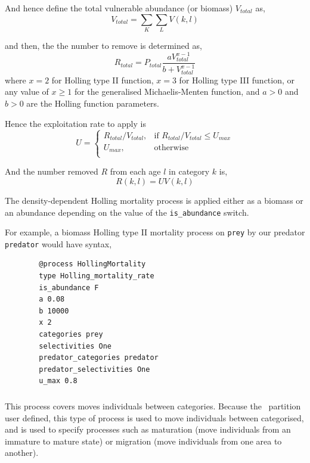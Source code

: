 And hence define the total vulnerable abundance (or biomass) $V_{total}$ as,
\begin{equation}
	V_{total}  = \sum\limits_K {\sum\limits_L {V(k,l)}} 
\end{equation}

and then, the the number to remove is determined as,
\begin{equation}
	R_{total} = P_{total} \frac{a  V_{total}^{x-1}}{b + V_{total}^{x-1}}
\end{equation}
where $x=2$ for Holling type II function,  $x=3$ for Holling type III function, or any value of $x \geq 1$ for the generalised Michaelis-Menten function, and $a > 0$ and $b > 0$ are the Holling function parameters.

Hence the exploitation rate to apply is 
\begin{equation}
	U = \begin{cases}
		R_{total}/V_{total}, & \text{if $R_{total}/V_{total} \leq U_{max}$} \\
		U_{max}, & \text{otherwise}\\ 
	\end{cases} 
\end{equation}

And the number removed $R$ from each age $l$ in category $k$ is,
\begin{equation}
	R(k,l) = UV(k,l)
\end{equation}

The density-dependent Holling mortality process is applied either as a biomass or an abundance depending on the value of the \texttt{is\_abundance} switch.

For example, a biomass Holling type II mortality process on \texttt{prey} by our predator \texttt{predator} would have syntax,

{\small{\begin{verbatim}
		@process HollingMortality
		type Holling_mortality_rate
		is_abundance F
		a 0.08
		b 10000
		x 2
		categories prey
		selectivities One
		predator_categories predator
		predator_selectivities One
		u_max 0.8
		\end{verbatim}}}

\subsubsection{}

This process covers moves individuals between categories. Because the \CNAME\ partition user defined, this type of process is used to move individuals between categorised, and is used to specify processes such as maturation (move individuals from an immature to mature state) or migration (move individuals from one area to another). 

